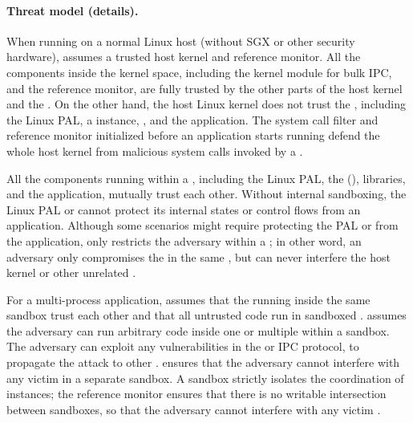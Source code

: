 \paragraph{Threat model (details).}
When running on a normal Linux host (without SGX or other security hardware), \graphene{} assumes a trusted host kernel and reference monitor.
All the components inside the kernel space, including the  kernel module for bulk IPC, and the reference monitor,
are fully trusted by the other parts of the host kernel and the \graphene{} \picoprocs{}.
On the other hand,
the host Linux kernel does not trust the \picoproc{}, including the Linux PAL, a \thelibos{} instance, \glibc{}, and the application.
The system call filter and reference monitor
initialized before an application starts running
defend the whole host kernel from malicious system calls invoked by a \picoproc{}.



All the components running within a \picoproc{}, including the Linux PAL, the \libos{} (\thelibos{}), \glibc{} libraries, and the application,
mutually trust each other. %
Without internal sandboxing, the Linux PAL or \thelibos{}
cannot protect its internal states or control flows from an application.
Although some scenarios might require protecting the PAL or \thelibos{}
from the application,
\graphene{} only restricts the adversary
within a \picoproc{};
in other word, an adversary
only compromises the \libos{} in the same \picoproc{},
but can never interfere the host kernel 
or other unrelated \picoprocs{}.



For a multi-process application,
\graphene{} assumes that the \picoprocs{} 
running inside the same sandbox
trust each other and that all untrusted code run in sandboxed \picoprocs{}.
\graphene{} assumes the adversary can run arbitrary code inside
one or multiple \picoprocs within a sandbox.
The adversary can exploit any vulnerabilities in the \libos{}
or IPC protocol,
to propagate the attack to other \picoprocs{}.
\graphene{} ensures that
the adversary cannot interfere with any victim \picoprocs{}
in a separate sandbox.
A sandbox strictly isolates the coordination of \thelibos{} instances;
the reference monitor ensures
that there is no writable intersection between sandboxes, so that
the adversary cannot interfere with any victim \picoprocs{}.


